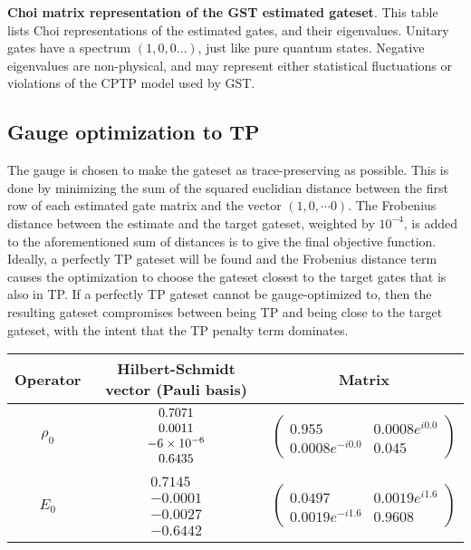 {\begin{table}[h]
\begin{center}
\caption{\textbf{Choi matrix representation of the GST estimated gateset}.  This table lists Choi representations of the estimated gates, and their eigenvalues.  Unitary gates have a spectrum $(1,0,0\ldots)$, just like pure quantum states.  Negative eigenvalues are non-physical, and may represent either statistical fluctuations or violations of the CPTP model used by GST.\label{bestTargetGatesGatesetChoiTable}}
\end{center}
\end{table}

\clearpage

\subsection{Gauge optimization to TP}
The gauge is chosen to make the gateset as trace-preserving as possible.  This is done by minimizing the sum of the squared euclidian distance between the first row of each estimated gate matrix and the vector $(1,0,\cdots 0)$.  The Frobenius distance between the estimate and the target gateset, weighted by $10^{-4}$, is added to the aforementioned sum of distances is to give the final objective function.  Ideally, a perfectly TP gateset will be found and the Frobenius distance term causes the optimization to choose the gateset closest to the target gates that is also in TP.  If a perfectly TP gateset cannot be gauge-optimized to, then the resulting gateset compromises between being TP and being close to the target gateset, with the intent that the TP penalty term dominates.

\begin{table}[h]
\begin{center}
\begin{tabular}[l]{|c|c|c|}
\hline
Operator & Hilbert-Schmidt vector (Pauli basis) & Matrix \\ \hline
$\rho_{0}$ & $ \begin{array}{c}
0.7071 \\ 
0.0011 \\ 
-6\times 10^{-6} \\ 
0.6435
 \end{array} $
 & $ \left(\!\!\begin{array}{cc}
0.955 & 0.0008e^{i0.0} \\ 
0.0008e^{-i0.0} & 0.045
 \end{array}\!\!\right) $
 \\ \hline
$E_{0}$ & $ \begin{array}{c}
0.7145 \\ 
-0.0001 \\ 
-0.0027 \\ 
-0.6442
 \end{array} $
 & $ \left(\!\!\begin{array}{cc}
0.0497 & 0.0019e^{i1.6} \\ 
0.0019e^{-i1.6} & 0.9608
 \end{array}\!\!\right) $
 \\ \hline
\end{tabular}


\end{center}
\end{table}}
